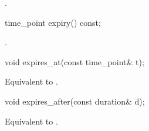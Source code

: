 \begin{itemdescr}
\pnum
\returns {}.
\end{itemdescr}

\begin{itemdecl}
time_point expiry() const;
\end{itemdecl}

\begin{itemdescr}
\pnum
\returns {}.
\end{itemdescr}

\begin{itemdecl}
void expires_at(const time_point& t);
\end{itemdecl}

\begin{itemdescr}
\pnum
\effects Equivalent to .
\end{itemdescr}

\begin{itemdecl}
void expires_after(const duration& d);
\end{itemdecl}

\begin{itemdescr}
\pnum
\effects Equivalent to .
\end{itemdescr}



